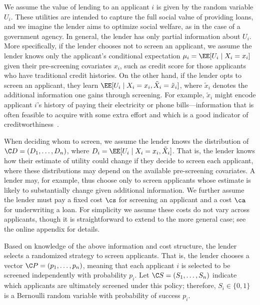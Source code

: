 \documentclass[10pt]{article}
\begin{document}
\begin{ReviewVerbatim}

We assume the value of lending to an applicant \(i\) is given by the random variable \(U_i\).
These utilities are intended to capture the full social value of providing loans, and we imagine the lender aims to optimize social welfare, as in the case of a government agency.
In general, the lender has only partial information about \(U_i\). More specifically, if the lender chooses not to screen an applicant, we assume the lender knows only the applicant's conditional expectation \(\mu_i = \EE [U_i \mid X_i = x_i]\)
given their pre-screening covariates \(x_i\), such as credit score for those applicants who have traditional credit histories.
On the other hand, if the lender opts to screen an applicant, they learn \(\EE[U_i \mid X_i = x_i, \tilde{X}_i = \tilde{x}_i]\), where \(\tilde{x}_i\) denotes the additional information one gains through screening.
For example, \(\tilde{x}_i\) might encode applicant \(i\)'s history of paying
their electricity or phone bills---information that is often feasible to acquire with some extra effort and which is a good indicator of creditworthiness~\cite{fdic2018}.

When deciding whom to screen, we assume
the lender knows the distribution of \(\C D = (D_1, \ldots, D_n)\), where \(D_i = \EE[U_i \mid X_i = x_i, \tilde{X}_i]\).
That is, the lender knows how their estimate of utility could change if they decide to screen each applicant, where these distributions may depend on the available pre-screening covariates.
A lender may, for example, thus choose only to screen applicants whose estimate is likely to substantially change given additional information.
We further assume the lender must pay a
fixed cost \(\cs\) for screening an applicant
and a cost \(\ca\) for underwriting a loan.
For simplicity we assume these costs do not vary across applicants, though it is straightforward to extend to the more general case; see the online appendix for details.

Based on knowledge of the above information and cost structure, the lender selects a randomized strategy to screen applicants.
That is, the lender chooses a vector
\(\C P = (p_1, \dots, p_n)\), meaning that each applicant \(i\) is selected to be screened independently with probability \(p_i\).
Let \(\C S = (S_1, \dots, S_n)\) indicate which applicants are ultimately screened under this policy; therefore, \(S_i \in \{0,1\}\) is a Bernoulli random variable with probability of success \(p_i\).


\end{ReviewVerbatim}
\end{document}
